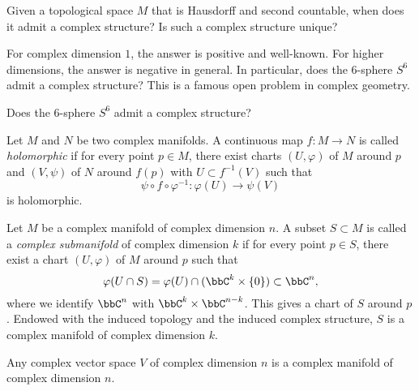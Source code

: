     \begin{question}\label{qs:existence_and_uniqueness_of_complex_structure}
        Given a topological space \(M\) that is Hausdorff and second countable, when does it admit a complex structure?
        Is such a complex structure unique?
    \end{question}

    For complex dimension \(1\), the answer is positive and well-known.
    For higher dimensions, the answer is negative in general.
    In particular, does the \(6\)-sphere \(S^6\) admit a complex structure?
    This is a famous open problem in complex geometry.

    \begin{question}\label{qs:complex_structure_on_S6}
        Does the \(6\)-sphere \(S^6\) admit a complex structure?
    \end{question}

    \begin{definition}\label{def:holomorphic_map_between_complex_manifolds}
        Let \(M\) and \(N\) be two complex manifolds.
        A continuous map \(f: M\to N\) is called \emph{holomorphic} if for every point \(p\in M\), there exist charts \((U,\varphi)\) of \(M\) around \(p\) and \((V,\psi)\) of \(N\) around \(f(p)\) with \(U \subset f^{-1}(V)\) such that
        \[
            \psi\circ f\circ \varphi^{-1}: \varphi(U)\to \psi(V)
        \]
        is holomorphic.
    \end{definition}

    \begin{definition}\label{def:submanifold_of_complex_manifold}
        Let \(M\) be a complex manifold of complex dimension \(n\).
        A subset \(S\subset M\) is called a \emph{complex submanifold} of complex dimension \(k\) if for every point \(p\in S\), there exist a chart \((U,\varphi)\) of \(M\) around \(p\) such that
        \[
            \varphi(U\cap S) = \varphi(U)\cap (\bbC^k\times \{0\}) \subset \bbC^n,
        \]
        where we identify \(\bbC^n\) with \(\bbC^k\times \bbC^{n-k}\).
        This gives a chart of \(S\) around \(p\).
        Endowed with the induced topology and the induced complex structure, \(S\) is a complex manifold of complex dimension \(k\).
    \end{definition}

    \begin{example}\label{eg:complex_vector_space_as_complex_manifold}
        Any complex vector space \(V\) of complex dimension \(n\) is a complex manifold of complex dimension \(n\).        
    \end{example}

